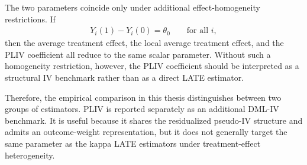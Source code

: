 \documentclass[12pt,a4paper]{article}
\begin{document}
The two parameters coincide only under additional effect-homogeneity restrictions. If
\begin{align}
    Y_i(1)-Y_i(0)=\theta_0
    \qquad
    \text{for all } i,
    \label{eq:homogeneous_effects_comparison}
\end{align}
then the average treatment effect, the local average treatment effect, and the PLIV coefficient
all reduce to the same scalar parameter. Without such a homogeneity restriction, however, the
PLIV coefficient should be interpreted as a structural IV benchmark rather than as a direct
LATE estimator.

Therefore, the empirical comparison in this thesis distinguishes between two groups of
estimators. PLIV is reported separately as an additional DML-IV benchmark. It is useful
because it shares the residualized pseudo-IV structure and admits an outcome-weight
representation, but it does not generally target the same parameter as the kappa LATE
estimators under treatment-effect heterogeneity.


\end{document}
